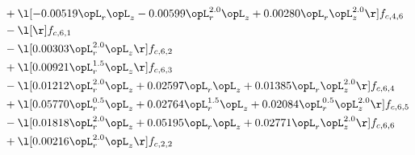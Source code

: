 \begin{alignat}{2}
& + \l[  -0.00519 \opL_r \opL_z   -0.00599 \opL_r^{2.0} \opL_z +  0.00280 \opL_r \opL_z^{2.0}  \r] f_{c,4,6} \nonumber \\ 
& - \l[  \r] f_{c,6,1} \nonumber \\ 
& - \l[  0.00303 \opL_r^{2.0} \opL_z  \r] f_{c,6,2} \nonumber \\ 
& + \l[  0.00921 \opL_r^{1.5} \opL_z  \r] f_{c,6,3} \nonumber \\ 
& - \l[  0.01212 \opL_r^{2.0} \opL_z +  0.02597 \opL_r \opL_z +  0.01385 \opL_r \opL_z^{2.0}  \r] f_{c,6,4} \nonumber \\ 
& + \l[  0.05770 \opL_r^{0.5} \opL_z +  0.02764 \opL_r^{1.5} \opL_z +  0.02084 \opL_r^{0.5} \opL_z^{2.0}  \r] f_{c,6,5} \nonumber \\ 
& - \l[  0.01818 \opL_r^{2.0} \opL_z +  0.05195 \opL_r \opL_z +  0.02771 \opL_r \opL_z^{2.0}  \r] f_{c,6,6} \nonumber \\ 
& + \l[  0.00216 \opL_r^{2.0} \opL_z  \r] f_{c,2,2} \nonumber \\ 
\end{alignat} 


